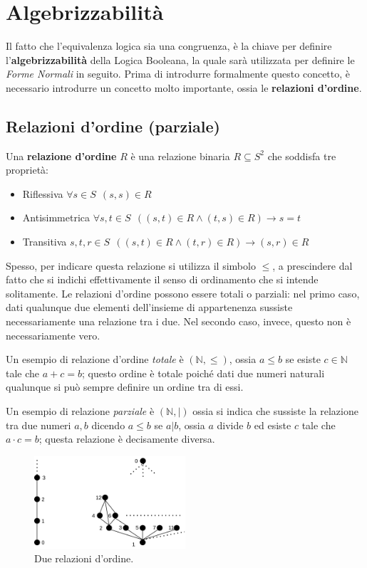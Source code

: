 \section{Algebrizzabilità}
Il fatto che l'equivalenza logica sia una congruenza, è la chiave per 
definire l'\textbf{algebrizzabilità} della Logica Booleana, la quale sarà 
utilizzata per definire le \textit{Forme Normali} in seguito. 
Prima di introdurre formalmente questo concetto, è necessario introdurre 
un concetto molto importante, ossia le \textbf{relazioni d'ordine}.  

\subsection{Relazioni d'ordine (parziale)}
Una \textbf{relazione d'ordine} $R$ è una relazione 
binaria $R \subseteq S^2$ che soddisfa tre 
proprietà: 
\begin{itemize}
  \item Riflessiva $\forall s \in S ~~ (s,s) \in R$
  \item Antisimmetrica $\forall s, t \in S ~~ ((s,t)\in R \land  (t,s) \in R) \rightarrow s = t$
  \item Transitiva $s,t,r \in S  ~~ ((s,t) \in R \land (t,r) \in R) \rightarrow (s,r) \in R$
\end{itemize}

Spesso, per indicare questa relazione si utilizza il simbolo $\leq$, a prescindere 
dal fatto che si indichi effettivamente il senso di ordinamento che si intende 
solitamente. Le relazioni d'ordine possono essere totali o parziali: nel 
primo caso, dati qualunque due elementi dell'insieme di appartenenza sussiste 
necessariamente una relazione tra i due. Nel secondo caso, invece, questo non 
è necessariamente vero. 

Un esempio di relazione d'ordine \textit{totale} è 
$(\mathbb{N}, \leq)$, ossia $a \leq b$ se esiste $c \in \mathbb{N}$ tale 
che $a + c = b$; questo ordine è totale poiché dati due numeri 
naturali qualunque si può sempre definire un ordine tra di essi.

Un esempio di relazione \textit{parziale} è 
$(\mathbb{N}, |)$ ossia si indica che sussiste la relazione 
tra due numeri $a, b$ dicendo $a \leq b$ se $a | b$, ossia $a$ divide $b$ 
ed esiste $c$ tale che $a \cdot c = b$; questa relazione è decisamente 
diversa.

\begin{figure}[!h]
  \centering 
  \includegraphics[width=0.5\textwidth]{images/reticolo2.png}
  \caption{Due relazioni d'ordine.}
  \label{figure:relazionireticoli}
\end{figure}

